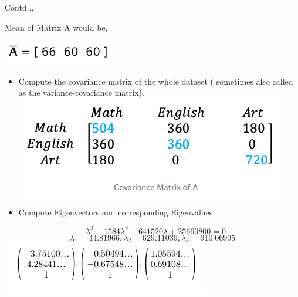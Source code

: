 \documentclass{beamer}
\begin{document}
\begin{frame}{Contd...}
	\begin{flushleft}
	Mean of Matrix A would be,\\
	\end{flushleft}
	\includegraphics[scale=0.4]{meanA}\\
	\begin{itemize}
	\item Compute the covariance matrix of the whole dataset ( sometimes also called as the variance-covariance matrix).
	\includegraphics[scale=0.4]{covarianceA}\\
	\item Compute Eigenvectors and corresponding Eigenvalues
	\end{itemize}
	\begin{equation*}
		-\lambda^3 + 1584\lambda^2 - 641520\lambda + 25660800 = 0
	\end{equation*}
	\begin{equation*}
		\lambda_1 = 44.81966, \lambda_2 = 629.11039, \lambda_3 = 910.06995
	\end{equation*}
	\includegraphics[scale=0.5]{eigen_vec}
\end{frame}
\end{document}
